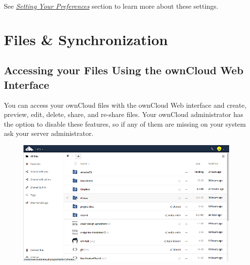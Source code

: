 \documentclass[letterpaper,10pt,english]{sphinxmanual}
\begin{document}
See {\hyperref[userpreferences::doc]{\emph{Setting Your Preferences}}} section to learn more about these settings.


\chapter{Files \& Synchronization}
\label{files/index:files-synchronization}\label{files/index::doc}

\section{Accessing your Files Using the ownCloud Web Interface}
\label{files/access_webgui::doc}\label{files/access_webgui:accessing-your-files-using-the-owncloud-web-interface}
You can access your ownCloud files with the ownCloud Web interface and create,
preview, edit, delete, share, and re-share files. Your ownCloud administrator
has the option to disable these features, so if any of them are missing on your
system ask your server administrator.
\begin{figure}[htbp]
\centering

\includegraphics{files_page.png}
\end{figure}
\end{document}
